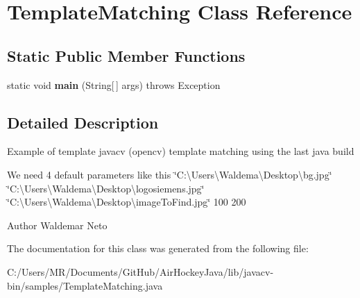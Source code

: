 \hypertarget{class_template_matching}{}\section{Template\+Matching Class Reference}
\label{class_template_matching}
\subsection*{Static Public Member Functions}
\begin{DoxyCompactItemize}
\item 
\hypertarget{class_template_matching_a10d3e94b4529de9bb032ef5e9dc2854f}{}static void {\bfseries main} (String\mbox{[}$\,$\mbox{]} args)  throws Exception \label{class_template_matching_a10d3e94b4529de9bb032ef5e9dc2854f}

\end{DoxyCompactItemize}


\subsection{Detailed Description}
Example of template javacv (opencv) template matching using the last java build

We need 4 default parameters like this \char`\"{}\+C\+:\textbackslash{}\+Users\textbackslash{}\+Waldema\textbackslash{}\+Desktop\textbackslash{}bg.\+jpg\char`\"{} \char`\"{}\+C\+:\textbackslash{}\+Users\textbackslash{}\+Waldema\textbackslash{}\+Desktop\textbackslash{}logosiemens.\+jpg\char`\"{} \char`\"{}\+C\+:\textbackslash{}\+Users\textbackslash{}\+Waldema\textbackslash{}\+Desktop\textbackslash{}image\+To\+Find.\+jpg\char`\"{} 100 200

\begin{DoxyAuthor}{Author}
Waldemar Neto 
\end{DoxyAuthor}


The documentation for this class was generated from the following file\+:\begin{DoxyCompactItemize}
\item 
C\+:/\+Users/\+M\+R/\+Documents/\+Git\+Hub/\+Air\+Hockey\+Java/lib/javacv-\/bin/samples/Template\+Matching.\+java\end{DoxyCompactItemize}
